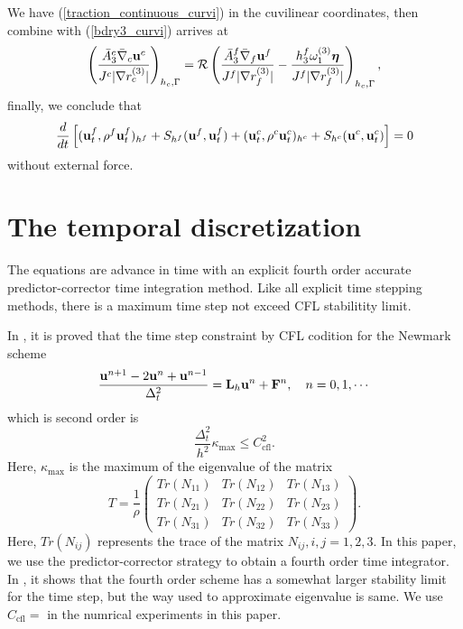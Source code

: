 \documentclass[a4paper]{article}
\begin{document}
We have (\ref{traction_continuous_curvi}) in the cuvilinear coordinates, then combine with (\ref{bdry3_curvi}) arrives at
\begin{equation*}
\left(\frac{\bar{A}_3^c\bar{\nabla}_c{\bf u}^c}{J^c|\nabla r_c^{(3)}|}\right)_{h_c,\Gamma} = \mathcal{R}\left(\frac{\bar{A}_3^f\bar{\nabla}_f{\bf u}^f}{J^f|\nabla r_f^{(3)}|} - \frac{h_3^f\omega_1^{(3)}{\bm \eta}}{J^f|\nabla r_f^{(3)}|}\right)_{h_c,\Gamma},
\end{equation*}
finally, we conclude that
\begin{equation*}
\frac{d}{dt}\left[({\bf u}_t^f,\rho^f {\bf u}_t^f)_{h^f} + S_{h^f}({\bf u}^f,{\bf u}^f_t) + ({\bf u}_t^c,\rho^c {\bf u}_t^c)_{h^c} + S_{h^c}({\bf u}^c,{\bf u}^c_t) \right]  = 0
\end{equation*}
without external force.

\section{The temporal discretization}
The equations are advance in time with an explicit fourth order accurate predictor-corrector time integration method. Like all explicit time stepping methods, there is a maximum time step not exceed CFL stabilitity limit.

In \cite{?}, it is proved that the time step constraint by CFL codition for the Newmark scheme 
\begin{equation*}
\frac{{\bf u}^{n+1}-2{\bf u}^n + {\bf u}^{n-1}}{\Delta_t^2} = {\bf L}_h{\bf u}^n + {\bf F}^n, \ \ \ n = 0,1,\cdots
\end{equation*}
 which is second order is
\begin{equation*}
\frac{\Delta_t^2}{h^2}\kappa_{\text{max}}\leq C_{\text{cfl}}^2.
\end{equation*}
Here, 
$\kappa_{\text{max}}$ is the maximum of the eigenvalue of the matrix 
\[T = \frac{1}{\rho}\left(\begin{array}{ccc}
Tr(N_{11}) &  Tr(N_{12})& Tr(N_{13})\\
Tr(N_{21}) & Tr(N_{22}) & Tr(N_{23})\\
Tr(N_{31}) & Tr(N_{32}) & Tr(N_{33})\end{array}\right). \]
Here, $Tr(N_{ij})$ represents the trace of the matrix $N_{ij},i,j = 1,2,3$. In this paper, we use the predictor-corrector strategy to obtain a fourth order time integrator. In \cite{?}, it shows that the fourth order scheme has a somewhat larger stability limit for the time step, but the way used to approximate eigenvalue is same. We use $C_{\text{cfl}} = $ in the numrical experiments in this paper.
\end{document}
